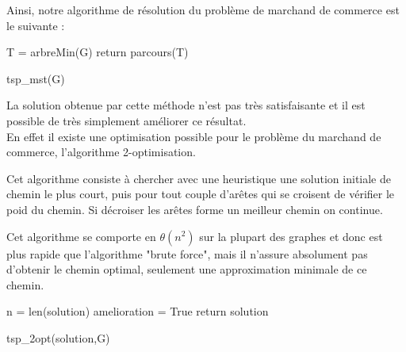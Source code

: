 \documentclass{article}
\begin{document}
  Ainsi, notre algorithme de résolution du problème de marchand de commerce est le suivante : 

  \begin{algorithm}
    \SetAlgoLined
    T = arbreMin(G)\;
    return parcours(T)\;
    \caption{tsp\_mst(G)}
  \end{algorithm}


  La solution obtenue par cette méthode n'est pas très satisfaisante et il est possible de très simplement améliorer ce résultat. \\ 

  En effet il existe une optimisation possible pour le problème du marchand de commerce, l'algorithme 2-optimisation.

  Cet algorithme consiste à chercher avec une heuristique une solution initiale de chemin le plus court, puis pour tout couple d'arêtes qui se croisent de vérifier le poid du chemin. Si décroiser les arêtes forme un meilleur chemin on continue.

  Cet algorithme se comporte en $\theta (n^2)$ sur la plupart des graphes et donc est plus rapide que l'algorithme "brute force", mais il n'assure absolument pas d'obtenir le chemin optimal, seulement une approximation minimale de ce chemin.\\
  \newline
  \begin{algorithm}[H]
    \SetAlgoLined
    n = len(solution)\;
    amelioration = True\;
    return solution\;
    \caption{tsp\_2opt(solution,G)}
  \end{algorithm}
\end{document}
